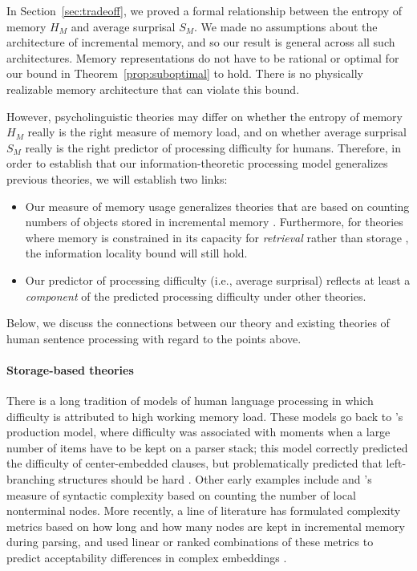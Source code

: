 In Section~\ref{sec:tradeoff}, we proved a formal relationship between the entropy of memory $H_M$ and average surprisal $S_M$. 
We made no assumptions about the architecture of incremental memory, and so our result is general across all such architectures.
Memory representations do not have to be rational or optimal for our bound in Theorem~\ref{prop:suboptimal} to hold.
There is no physically realizable memory architecture that can violate this bound.

However, psycholinguistic theories may differ on whether the entropy of memory $H_M$ really is the right measure of memory load, and on whether average surprisal $S_M$ really is the right predictor of processing difficulty for humans. Therefore, in order to establish that our information-theoretic processing model generalizes previous theories, we will establish two links:
\begin{itemize}
    \item Our measure of memory usage generalizes theories that are based on counting numbers of objects stored in incremental memory \citep[e.g.,][]{yngve1960model,miller-finitary-1963,frazier1985syntactic,gibson-linguistic-1998,kobele2013memory,graf2014evaluating,GrafEtAl15MOL,gerth2015memory,GrafEtAl17JLM,desanto2020parsing}. Furthermore, for theories where memory is constrained in its capacity for \emph{retrieval} rather than storage \citep[e.g.,][]{mcelree-memory-2003,lewis-activation-based-2005}, the information locality bound will still hold.
    \item Our predictor of processing difficulty (i.e., average surprisal) reflects at least a \emph{component} of the predicted processing difficulty under other theories.
\end{itemize}

Below, we discuss the connections between our theory and existing theories of human sentence processing with regard to the points above.

\paragraph{Storage-based theories}

There is a long tradition of models of human language processing in which difficulty is attributed to high working memory load. 
These models go back to \citet{yngve1960model}'s production model, where difficulty was associated with moments when a large number of items have to be kept on a parser stack; this model correctly predicted the difficulty of center-embedded clauses, but problematically predicted that left-branching structures should be hard \citep{kimball1973}. Other early examples include \citet{miller-finitary-1963} and \citet{frazier1985syntactic}'s measure of syntactic complexity based on counting the number of local nonterminal nodes. More recently, a line of literature has formulated complexity metrics based on how long and how many nodes are kept in incremental memory during parsing, and used linear or ranked combinations of these metrics to predict acceptability differences in complex embeddings \citep{kobele2013memory,graf2014evaluating,rambow201512,GrafEtAl15MOL,gerth2015memory,GrafEtAl17JLM,desanto2020parsing}.

